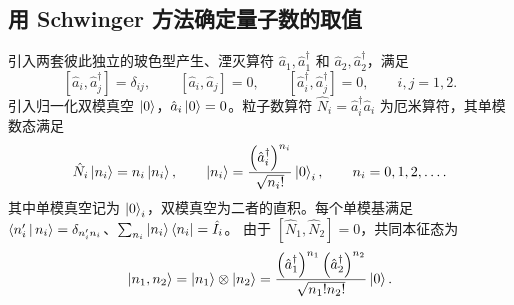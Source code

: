 \subsection{用 Schwinger 方法确定量子数的取值}
引入两套彼此独立的玻色型产生、湮灭算符
$\hat a_1,\hat a_1^\dag$ 和 $\hat a_2,\hat a_2^\dag$，满足
\begin{equation}
\left[\hat a_i,\hat a_j^\dag\right]=\delta_{ij},\qquad
\left[\hat a_i,\hat a_j\right]=0,\qquad
\left[\hat a_i^\dag,\hat a_j^\dag\right]=0,\qquad i,j=1,2.
\end{equation}
引入归一化双模真空 $\Ket{0}$，$\hat a_i\Ket{0}=0$。粒子数算符
$\hat N_i=\hat a_i^\dag\hat a_i$ 为厄米算符，其单模数态满足
\begin{equation}
\hat N_i\Ket{n_i}=n_i\Ket{n_i},\qquad
\Ket{n_i}=\frac{\left(\hat a_i^\dag\right)^{n_i}}{\sqrt{n_i!}}\Ket{0}_i,
\qquad n_i=0,1,2,\ldots.
\end{equation}
其中单模真空记为 $\Ket{0}_i$，双模真空为二者的直积。每个单模基满足
$\Braket{n_i'|n_i}=\delta_{n_i'n_i}$、$\sum_{n_i}\Ket{n_i}\Bra{n_i}=\hat I_i$。
由于 $\left[\hat N_1,\hat N_2\right]=0$，共同本征态为
\begin{equation}
\Ket{n_1,n_2}=\Ket{n_1}\otimes\Ket{n_2}
=\frac{\left(\hat a_1^\dag\right)^{n_1}\left(\hat a_2^\dag\right)^{n_2}}
{\sqrt{n_1!n_2!}}\Ket{0}.
\end{equation}

